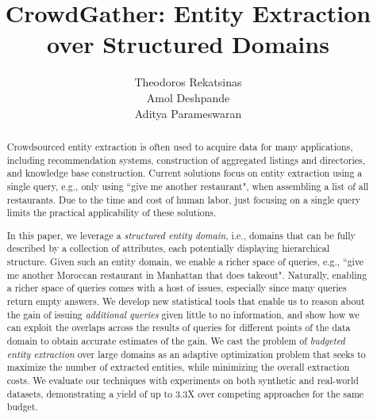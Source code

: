 \documentclass{vldb}
\begin{document}

\title{CrowdGather: Entity Extraction over Structured Domains}


\author{
	\alignauthor Theodoros Rekatsinas\\
            \alignauthor Amol Deshpande\\
            \alignauthor Aditya Parameswaran \\
}

\maketitle

\begin{abstract}
Crowdsourced entity extraction is often used to acquire data for many applications, including recommendation systems, 
construction of aggregated listings and directories, and knowledge base construction. Current solutions focus on entity extraction using a single query, e.g., only using ``give me another restaurant", when assembling a list of all restaurants. Due to the time and cost of human labor, just focusing on a single query limits the practical applicability of these solutions.

In this paper, we leverage a {\em structured entity domain}, i.e., domains that can be fully described by a collection of attributes, each potentially displaying hierarchical structure. Given such an entity domain, we enable a richer space of queries, e.g., ``give me another Moroccan restaurant in Manhattan that does takeout". Naturally, enabling a richer space of queries comes with a host of issues, especially since many queries return empty answers. We develop new statistical tools that enable us to reason about the gain of issuing {\em additional queries} given little to no information, and show how we can exploit the overlaps across the results of queries for different points of the data
domain to obtain accurate estimates of the gain. We cast the problem of {\em budgeted entity extraction} over large domains as an adaptive optimization problem that seeks to maximize the number of extracted entities, while minimizing the overall extraction costs. We evaluate our techniques with experiments on both synthetic and real-world datasets, demonstrating a yield of up to 3.3X over competing approaches for the same budget.
\end{abstract}








\balance

{\scriptsize


}
\end{document}

